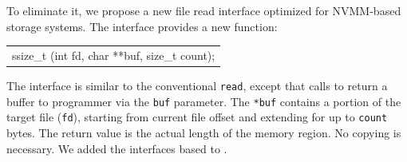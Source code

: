 To eliminate it, we propose a new file read interface optimized for
NVMM-based storage systems.  The interface provides a new function:

\vspace{1em}
\begin{tabular}{l}
ssize\_t \grb{}(int fd, char **buf, size\_t count);\\
\end{tabular}
\vspace{1em}


The interface is similar to the conventional \texttt{read}, except that calls
to \texttt{\grb{}} return a buffer to programmer via the \texttt{buf}
parameter.  The \texttt{*buf} contains a portion of the target file
(\texttt{fd}), starting from current file offset and extending for up to
\texttt{count} bytes.  The return value is the actual length of the memory
region.  No copying is necessary.  We added the \grb{} interfaces based to
\DAChell{}.



